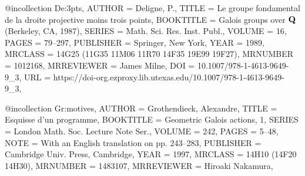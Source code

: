 @incollection {De:3pts,
    AUTHOR = {Deligne, P.},
     TITLE = {Le groupe fondamental de la droite projective moins trois
              points},
 BOOKTITLE = {Galois groups over {${\bf Q}$} ({B}erkeley, {CA}, 1987)},
    SERIES = {Math. Sci. Res. Inst. Publ.},
    VOLUME = {16},
     PAGES = {79--297},
 PUBLISHER = {Springer, New York},
      YEAR = {1989},
   MRCLASS = {14G25 (11G35 11M06 11R70 14F35 19E99 19F27)},
  MRNUMBER = {1012168},
MRREVIEWER = {James Milne},
       DOI = {10.1007/978-1-4613-9649-9_3},
       URL = {https://doi-org.ezproxy.lib.utexas.edu/10.1007/978-1-4613-9649-9_3},
}

@incollection {Gr:motives,
    AUTHOR = {Grothendieck, Alexandre},
     TITLE = {Esquisse d'un programme},
 BOOKTITLE = {Geometric {G}alois actions, 1},
    SERIES = {London Math. Soc. Lecture Note Ser.},
    VOLUME = {242},
     PAGES = {5--48},
      NOTE = {With an English translation on pp. 243--283},
 PUBLISHER = {Cambridge Univ. Press, Cambridge},
      YEAR = {1997},
   MRCLASS = {14H10 (14F20 14H30)},
  MRNUMBER = {1483107},
MRREVIEWER = {Hiroaki Nakamura},
}
